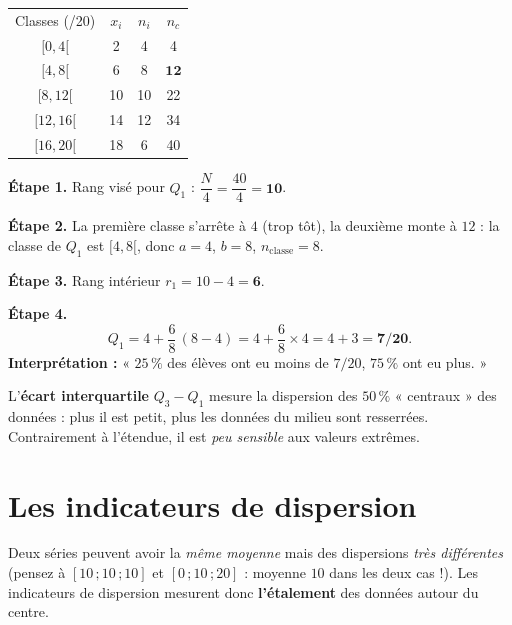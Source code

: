 \documentclass[11pt,a4paper]{article}
\begin{document}
\begin{exemple}[calcul de $Q_1$ — test noté sur 20, $N=40$ élèves]
\begin{center}
\renewcommand{\arraystretch}{1.15}
\begin{tabular}{c c c c}
\rowcolor{primary!18}
Classes (/20) & $x_i$ & $n_i$ & $n_c$ \\
$[0,4[$   & 2  & 4  & 4 \\
$[4,8[$   & 6  & 8  & $\mathbf{12}$ \\
$[8,12[$  & 10 & 10 & 22 \\
$[12,16[$ & 14 & 12 & 34 \\
$[16,20[$ & 18 & 6  & 40 \\
\end{tabular}
\end{center}
\textbf{Étape 1.} Rang visé pour $Q_1$ : $\dfrac{N}{4}=\dfrac{40}{4}=\mathbf{10}$.

\textbf{Étape 2.} La première classe s'arrête à $4$ (trop tôt), la deuxième monte à $12$ : la classe
de $Q_1$ est $[4,8[$, donc $a=4$, $b=8$, $n_{\text{classe}}=8$.

\textbf{Étape 3.} Rang intérieur $r_1=10-4=\mathbf{6}$.

\textbf{Étape 4.}
\[
Q_1=4+\frac{6}{8}\,(8-4)=4+\frac{6}{8}\times 4=4+3=\mathbf{7/20}.
\]
\textbf{Interprétation :} « $25\,\%$ des élèves ont eu moins de $7/20$, $75\,\%$ ont eu plus. »
\end{exemple}

\begin{theoreme}
L'\textbf{écart interquartile} $Q_3-Q_1$ mesure la dispersion des $50\,\%$ « centraux » des données :
plus il est petit, plus les données du milieu sont resserrées. Contrairement à l'étendue, il est
\emph{peu sensible} aux valeurs extrêmes.
\end{theoreme}

\section{Les indicateurs de dispersion}
Deux séries peuvent avoir la \emph{même moyenne} mais des dispersions \emph{très différentes}
(pensez à $[10\,;10\,;10]$ et $[0\,;10\,;20]$ : moyenne $10$ dans les deux cas !). Les indicateurs
de dispersion mesurent donc \textbf{l'étalement} des données autour du centre.
\end{document}
